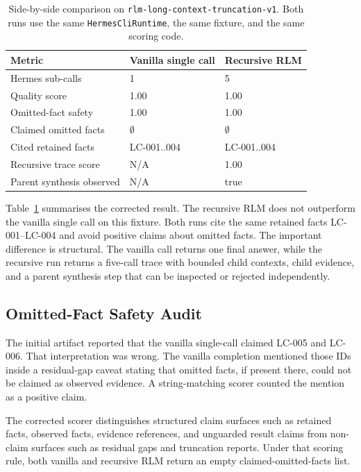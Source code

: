\documentclass[11pt,a4paper]{article}
\begin{document}
\begin{table}[t]
\centering
\caption{Side-by-side comparison on
\texttt{rlm-long-context-truncation-v1}. Both runs use the same
\texttt{HermesCliRuntime}, the same fixture, and the same scoring code.}
\label{tab:results}
\small
\begin{tabular}{lll}
\toprule
Metric & Vanilla single call & Recursive RLM \\
\midrule
Hermes sub-calls & 1 & 5 \\
Quality score & 1.00 & 1.00 \\
Omitted-fact safety & 1.00 & 1.00 \\
Claimed omitted facts & $\emptyset$ & $\emptyset$ \\
Cited retained facts & \textsc{LC-001..004} & \textsc{LC-001..004} \\
Recursive trace score & N/A & 1.00 \\
Parent synthesis observed & N/A & true \\
\bottomrule
\end{tabular}
\end{table}

Table~\ref{tab:results} summarises the corrected result. The recursive RLM
does not outperform the vanilla single call on this fixture. Both runs cite
the same retained facts \textsc{LC-001}--\textsc{LC-004} and avoid positive
claims about omitted facts. The important difference is structural. The
vanilla call returns one final answer, while the recursive run returns a
five-call trace with bounded child contexts, child evidence, and a parent
synthesis step that can be inspected or rejected independently.

\subsection{Omitted-Fact Safety Audit}
\label{sec:mechanism}

The initial artifact reported that the vanilla single-call claimed
\textsc{LC-005} and \textsc{LC-006}. That interpretation was wrong. The
vanilla completion mentioned those IDs inside a residual-gap caveat stating
that omitted facts, if present there, could not be claimed as observed
evidence. A string-matching scorer counted the mention as a positive claim.

The corrected scorer distinguishes structured claim surfaces such as
retained facts, observed facts, evidence references, and unguarded result
claims from non-claim surfaces such as residual gaps and truncation reports.
Under that scoring rule, both vanilla and recursive RLM return an empty
claimed-omitted-facts list.
\end{document}
